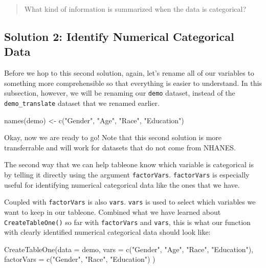 \documentclass[
]{book}
\newenvironment{Shaded}{\begin{snugshade}}{\end{snugshade}}
\newcommand{\AttributeTok}[1]{\textcolor[rgb]{0.77,0.63,0.00}{#1}}
\newcommand{\FunctionTok}[1]{\textcolor[rgb]{0.00,0.00,0.00}{#1}}
\newcommand{\NormalTok}[1]{#1}
\newcommand{\OtherTok}[1]{\textcolor[rgb]{0.56,0.35,0.01}{#1}}
\newcommand{\StringTok}[1]{\textcolor[rgb]{0.31,0.60,0.02}{#1}}
\begin{document}
\begin{quote}
What kind of information is summarized when the data is categorical?
\end{quote}

\hypertarget{solution-2-identify-numerical-categorical-data}{%
\subsection{Solution 2: Identify Numerical Categorical Data}\label{solution-2-identify-numerical-categorical-data}}

Before we hop to this second solution, again, let's rename all of our variables to something more comprehensible so that everything is easier to understand. In this subsection, however, we will be renaming our \texttt{demo} dataset, instead of the \texttt{demo\_translate} dataset that we renamed earlier.

\begin{Shaded}
\begin{Highlighting}[]
\FunctionTok{names}\NormalTok{(demo) }\OtherTok{\textless{}{-}} \FunctionTok{c}\NormalTok{(}\StringTok{"Gender"}\NormalTok{, }\StringTok{"Age"}\NormalTok{, }\StringTok{"Race"}\NormalTok{, }\StringTok{"Education"}\NormalTok{)}
\end{Highlighting}
\end{Shaded}

Okay, now we are ready to go! Note that this second solution is more transferrable and will work for datasets that do not come from NHANES.

The second way that we can help tableone know which variable is categorical is by telling it directly using the argument \texttt{factorVars}. \texttt{factorVars} is especially useful for identifying numerical categorical data like the ones that we have.

Coupled with \texttt{factorVars} is also \texttt{vars}. \texttt{vars} is used to select which variables we want to keep in our tableone. Combined what we have learned about \texttt{CreateTableOne()} so far with \texttt{factorVars} and \texttt{vars}, this is what our function with clearly identified numerical categorical data should look like:

\begin{Shaded}
\begin{Highlighting}[]
\FunctionTok{CreateTableOne}\NormalTok{(}\AttributeTok{data =}\NormalTok{ demo,}
               \AttributeTok{vars =} \FunctionTok{c}\NormalTok{(}\StringTok{"Gender"}\NormalTok{, }\StringTok{"Age"}\NormalTok{, }\StringTok{"Race"}\NormalTok{, }\StringTok{"Education"}\NormalTok{),}
               \AttributeTok{factorVars =} \FunctionTok{c}\NormalTok{(}\StringTok{"Gender"}\NormalTok{, }\StringTok{"Race"}\NormalTok{, }\StringTok{"Education"}\NormalTok{)}
\NormalTok{              )}
\end{Highlighting}
\end{Shaded}
\end{document}
